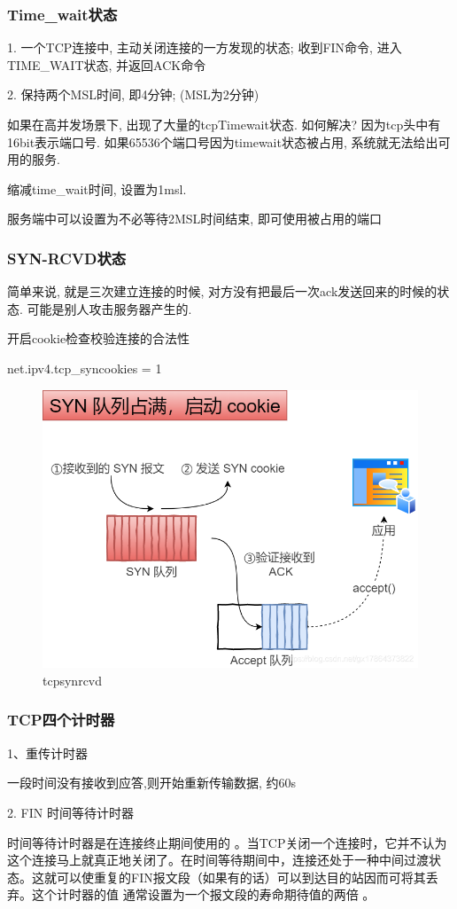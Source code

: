 \documentclass[UTF8]{ctexart}
\begin{document}
\subsubsection{Time\_wait状态}
1. 一个TCP连接中, 主动关闭连接的一方发现的状态; 收到FIN命令, 进入TIME\_WAIT状态, 并返回ACK命令

2. 保持两个MSL时间, 即4分钟; (MSL为2分钟)

如果在高并发场景下, 出现了大量的tcpTimewait状态. 如何解决? 因为tcp头中有16bit表示端口号. 如果65536个端口号因为timewait状态被占用, 系统就无法给出可用的服务.

缩减time\_wait时间, 设置为1msl.

服务端中可以设置为不必等待2MSL时间结束, 即可使用被占用的端口
\subsubsection{SYN-RCVD状态}
简单来说, 就是三次建立连接的时候, 对方没有把最后一次ack发送回来的时候的状态. 可能是别人攻击服务器产生的. \par

开启cookie检查校验连接的合法性

net.ipv4.tcp\_syncookies = 1
\begin{figure}
	\centering
	\includegraphics[width=0.7\linewidth]{figures/tcpsynrcvd.png}
	\caption{tcpsynrcvd}
	\label{fig:tcpsynrcvd}
\end{figure}
\subsubsection{TCP四个计时器}
1、重传计时器

一段时间没有接收到应答,则开始重新传输数据, 约60s

2. FIN 时间等待计时器

时间等待计时器是在连接终止期间使用的 。当TCP关闭一个连接时，它并不认为这个连接马上就真正地关闭了。在时间等待期间中，连接还处于一种中间过渡状态。这就可以使重复的FIN报文段（如果有的话）可以到达目的站因而可将其丢弃。这个计时器的值 通常设置为一个报文段的寿命期待值的两倍 。
\end{document}
